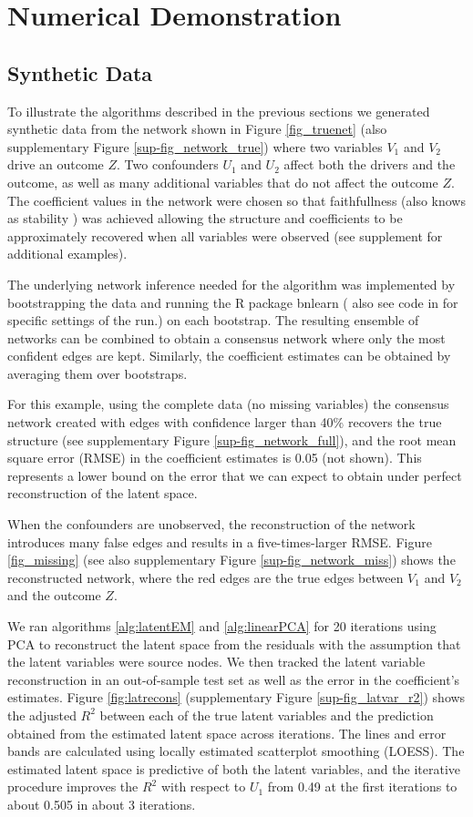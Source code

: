 \documentclass{article}
\begin{document}
\section{Numerical Demonstration}
\subsection{Synthetic Data}
To illustrate  the algorithms described in the previous sections we
generated synthetic data from the network shown in Figure
\ref{fig_truenet} (also supplementary Figure \ref{sup-fig_network_true}) where two variables $V_1$ and $V_2$ drive an outcome
$Z$. Two confounders $U_1$ and $U_2$ affect both the drivers and the
outcome, as well as many additional variables that do not affect the
outcome $Z$.
The coefficient values in the network were chosen so that faithfullness (also knows as stability \cite{pearl_causality:_2000}) was achieved allowing the structure and coefficients to be  approximately recovered when all variables were observed (see supplement for additional examples).

The underlying network inference needed for the algorithm was implemented by bootstrapping the data  and running the R package bnlearn (\cite{scutari_learning_2010} also see code in \cite{latent_2020} for specific settings of the run.) on each bootstrap.  The resulting ensemble of networks can be combined to obtain a consensus network where only the most confident edges are kept. Similarly, the coefficient estimates can be obtained by averaging them over bootstraps.

For this example, using the complete data (no missing variables) the consensus network created with edges with confidence larger than 40\% recovers the true structure (see supplementary Figure \ref{sup-fig_network_full}), and the root mean square error (RMSE) in the coefficient estimates is 0.05 (not shown). This represents a lower
bound on the error that we can expect to obtain under perfect reconstruction of the latent space.

When the confounders are unobserved, the reconstruction of the network introduces many false edges and results in a five-times-larger RMSE. Figure \ref{fig_missing} (see also supplementary Figure \ref{sup-fig_network_miss}) shows the reconstructed network, where the red edges are the true edges between $V_1$ and $V_2$ and the outcome $Z$.

We ran algorithms \ref{alg:latentEM} and \ref{alg:linearPCA} for 20 iterations using PCA to reconstruct the latent space from the residuals with the assumption that the latent variables were source nodes. We then tracked the latent variable reconstruction in an out-of-sample test set as well as the error in the coefficient's estimates. Figure \ref{fig:latrecons} (supplementary Figure \ref{sup-fig_latvar_r2}) shows the adjusted $R^2$ between each of the true latent variables and the prediction obtained from the estimated latent space across iterations. The lines and error bands are calculated using locally estimated scatterplot smoothing (LOESS). The estimated latent space is predictive of both the latent variables, and the iterative procedure improves the $R^2$ with respect to $U_1$ from 0.49 at the first iterations to about 0.505 in about 3 iterations.
\end{document}
